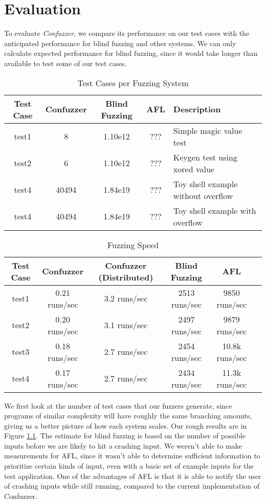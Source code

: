 \chapter{Evaluation}
To evaluate \textit{Confuzzer}, we compare its performance on our test cases
with the anticipated performance for blind fuzzing and other systems. We can
only calculate expected performance for blind fuzzing, since it would take
longer than available to test some of our test cases.

\begin{table}
\begin{center}
\begin{tabular}{| c | c | c | c | p{6cm} |}
\hline
Test Case & Confuzzer & Blind Fuzzing & AFL & Description\\\hline
test1 & 8 & 1.10e12 & ??? & Simple magic value test\\\hline
test2 & 6 & 1.10e12 & ??? & Keygen test using xored value\\\hline
test4 & 40494 & 1.84e19 & ??? & Toy shell example without overflow\\\hline
test4 & 40494 & 1.84e19 & ??? & Toy shell example with overflow\\\hline
\end{tabular}
\end{center}
\caption{Test Cases per Fuzzing System}
\label{table:evalcases}
\end{table}

\begin{table}
\begin{center}
\begin{tabular}{| c | c | c | c | c | p{6cm} |}
\hline
Test Case & Confuzzer & Confuzzer (Distributed) & Blind Fuzzing & AFL\\\hline
test1 & 0.21 runs/sec & 3.2 runs/sec & 2513 runs/sec & 9850 runs/sec\\\hline
test2 & 0.20 runs/sec & 3.1 runs/sec & 2497 runs/sec & 9879 runs/sec\\\hline
test3 & 0.18 runs/sec & 2.7 runs/sec & 2454 runs/sec & 10.8k runs/sec\\\hline
test4 & 0.17 runs/sec & 2.7 runs/sec & 2434 runs/sec & 11.3k runs/sec\\\hline
\end{tabular}
\end{center}
\caption{Fuzzing Speed}
\label{table:evaltime}
\end{table}

We first look at the number of test cases that our fuzzers generate, since
programs of similar complexity will have roughly the same branching amounts,
giving us a better picture of how each system scales. Our rough results are in
Figure \ref{table:evalcases}. The estimate for blind fuzzing is based on the
number of possible inputs before we are likely to hit a crashing input. We
weren't able to make measurements for AFL, since it wasn't able to determine
sufficient information to prioritize certain kinds of input, even with a basic
set of example inputs for the test application. One of the advantages of AFL is
that it is able to notify the user of crashing inputs while still running,
compared to the current implementation of Confuzzer.

